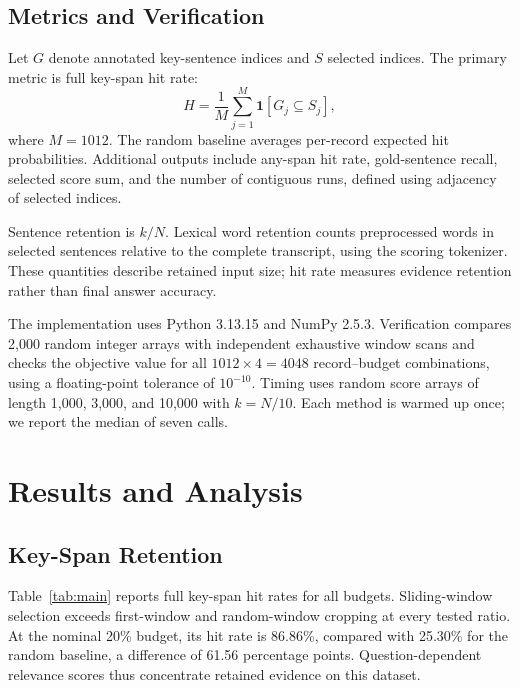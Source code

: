 \documentclass[10pt,journal,compsoc]{IEEEtran}
\begin{document}
\subsection{Metrics and Verification}
Let $G$ denote annotated key-sentence indices and $S$ selected indices. The primary metric is full key-span hit rate:
\begin{equation}
 H=\frac{1}{M}\sum_{j=1}^{M}\mathbf{1}[G_j\subseteq S_j],
\end{equation}
where $M=1012$. The random baseline averages per-record expected hit probabilities. Additional outputs include any-span hit rate, gold-sentence recall, selected score sum, and the number of contiguous runs, defined using adjacency of selected indices.

Sentence retention is $k/N$. Lexical word retention counts preprocessed words in selected sentences relative to the complete transcript, using the scoring tokenizer. These quantities describe retained input size; hit rate measures evidence retention rather than final answer accuracy.

The implementation uses Python 3.13.15 and NumPy 2.5.3. Verification compares 2,000 random integer arrays with independent exhaustive window scans and checks the objective value for all $1012\times4=4048$ record--budget combinations, using a floating-point tolerance of $10^{-10}$. Timing uses random score arrays of length 1,000, 3,000, and 10,000 with $k=N/10$. Each method is warmed up once; we report the median of seven calls.

\section{Results and Analysis}
\subsection{Key-Span Retention}
Table~\ref{tab:main} reports full key-span hit rates for all budgets. Sliding-window selection exceeds first-window and random-window cropping at every tested ratio. At the nominal 20\% budget, its hit rate is 86.86\%, compared with 25.30\% for the random baseline, a difference of 61.56 percentage points. Question-dependent relevance scores thus concentrate retained evidence on this dataset.

\begin{table}[t]
\caption{Full key-span hit rate (\%) on all 1,012 records. Budgets are nominal sentence ratios; every method uses the same per-record $k$. Random-window values are exact expectations.}
\label{tab:main}
\centering\footnotesize
\setlength{\tabcolsep}{4pt}

\end{table}
\end{document}
